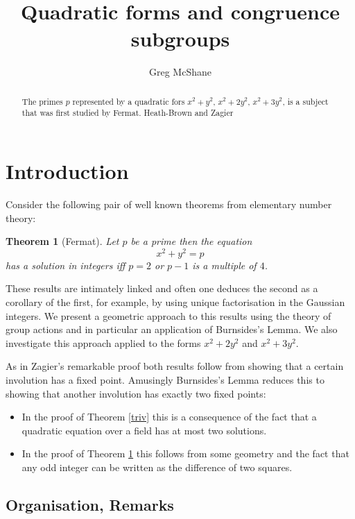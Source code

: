 \documentclass[12pt,a4paper]{amsart}
\title{Quadratic forms and  congruence subgroups}
\author[McShane]{Greg McShane}
\newtheorem{thm}{Theorem}[section]
\begin{document}
\maketitle

\begin{abstract} 
	The  primes $p$  represented by a quadratic fors 
	$x^2 + y^2$, 
	$x^2 + 2y^2$, 
	$x^2 + 3y^2$, 
	is a subject that was first  studied by Fermat. 
	Heath-Brown and Zagier 
\end{abstract} 


\section{Introduction}

Consider the following pair of well known theorems from elementary number theory:



\begin{thm}[Fermat]\label{main}
Let $p$ be a prime then the equation
$$x^2 + y^2 = p $$
has a solution in integers  iff  $p =2$ or $p-1$ is a multiple of $4$.
\end{thm}

These results are intimately linked and often one deduces the second as a corollary of the first,
 for example, by using unique factorisation in the Gaussian integers.  
 We present a  geometric  approach to this results  using the theory of group actions and in particular an application of Burnsides's Lemma. 
 We also investigate this approach applied to the forms $x^2 + 2y^2$ and $x^2 + 3y^2$.
 
 
As in Zagier's remarkable proof \cite{zagier} both results follow from showing that a certain involution has a fixed point. 
Amusingly Burnsides's Lemma reduces this to showing that another involution has exactly two fixed points:
\begin{itemize}
\item  In the proof of Theorem \ref{triv} this is a consequence of the fact that a quadratic equation 
over a field has at most two solutions.
\item In the proof of Theorem \ref{main} this follows from some geometry and the fact that 
	any odd integer can be written as the difference of two squares.
 \end{itemize}


\subsection{Organisation, Remarks}
\end{document}
